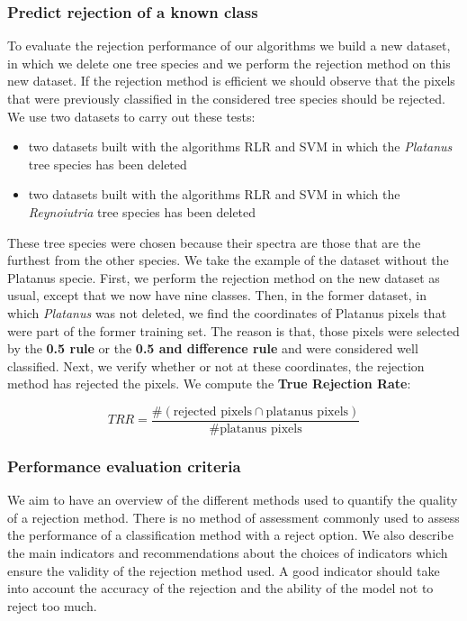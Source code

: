 \documentclass{siamart171218}
\begin{document}
\subsubsection{Predict rejection of a known class}
To evaluate the rejection performance of our algorithms we build a new dataset, in which we delete one tree species and we perform the rejection method on this new dataset. If the rejection method is efficient we should observe that the pixels that were previously classified in the considered tree species should be rejected. We use two datasets to carry out these tests: 
\begin{itemize}
\item{two datasets built with the algorithms RLR and SVM in which the \textit{Platanus} tree species has been deleted}
\item{two datasets built with the algorithms RLR and SVM in which the \textit{Reynoiutria} tree species has been deleted}
\end{itemize} 

These tree species were chosen because their spectra are those that are the furthest from the other species.
We take the example of the dataset without the Platanus specie. 
First, we perform the rejection method on the new dataset as usual, except that we now have nine classes. Then, in the former dataset, in which \textit{Platanus} was not deleted, we find the coordinates of Platanus pixels that were part of the former training set. The reason is that, those pixels were selected by the \textbf{0.5 rule} or the \textbf{0.5 and difference rule} and were considered well classified. Next, we verify whether or not at these coordinates, the rejection method has rejected the pixels. We compute the \textbf{True Rejection Rate}:

\begin{equation}
    TRR = \frac{\#(\text{rejected pixels} \cap \text{platanus pixels})}{\#\text{platanus pixels}}
    \label{TRR_platanus}
\end{equation}

\subsubsection{Performance evaluation criteria}

 
We aim to have an overview of the different methods used to quantify the quality of a rejection method. There is no method of assessment commonly used to assess the performance of a classification method with a reject option. We also describe the main indicators and recommendations about the choices of indicators which ensure the validity of the rejection method used.
A good indicator should take into account the accuracy of the rejection and the ability of the model not to reject too much. 
\end{document}
